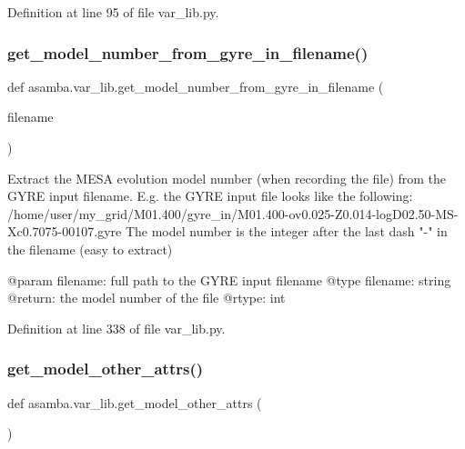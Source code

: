 Definition at line 95 of file var\+\_\+lib.\+py.

\mbox{\label{namespaceasamba_1_1var__lib_a311dce219a4bfcd63933f8f319aa03ce}} 
\subsubsection{\texorpdfstring{get\+\_\+model\+\_\+number\+\_\+from\+\_\+gyre\+\_\+in\+\_\+filename()}{get\_model\_number\_from\_gyre\_in\_filename()}}
{\footnotesize\ttfamily def asamba.\+var\+\_\+lib.\+get\+\_\+model\+\_\+number\+\_\+from\+\_\+gyre\+\_\+in\+\_\+filename (\begin{DoxyParamCaption}\item[{}]{filename }\end{DoxyParamCaption})}

\begin{DoxyVerb}Extract the MESA evolution model number (when recording the file) from the GYRE input filename.
E.g. the GYRE input file looks like the following:
/home/user/my_grid/M01.400/gyre_in/M01.400-ov0.025-Z0.014-logD02.50-MS-Xc0.7075-00107.gyre
The model number is the integer after the last dash "-" in the filename (easy to extract)

@param filename: full path to the GYRE input filename
@type filename: string
@return: the model number of the file
@rtype: int
\end{DoxyVerb}
 

Definition at line 338 of file var\+\_\+lib.\+py.

\mbox{\label{namespaceasamba_1_1var__lib_adc463e39504e5cd7acb15d499dec2880}} 
\subsubsection{\texorpdfstring{get\+\_\+model\+\_\+other\+\_\+attrs()}{get\_model\_other\_attrs()}}
{\footnotesize\ttfamily def asamba.\+var\+\_\+lib.\+get\+\_\+model\+\_\+other\+\_\+attrs (\begin{DoxyParamCaption}{ }\end{DoxyParamCaption})}


